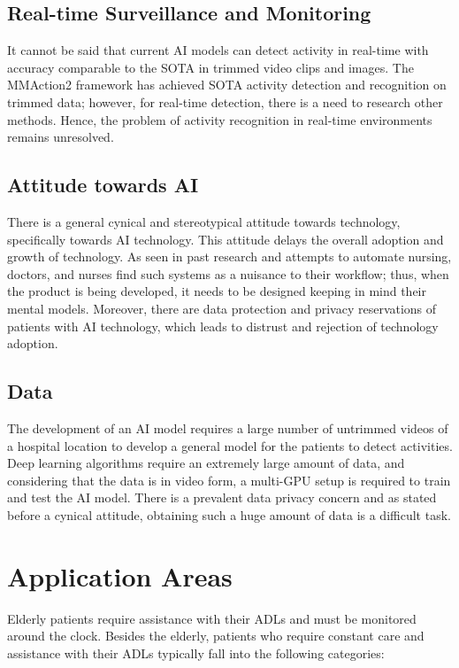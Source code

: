 \subsection{Real-time Surveillance and Monitoring}
It cannot be said that current AI models can detect activity in real-time with accuracy comparable to the SOTA  in trimmed video clips and images. The MMAction2 framework has achieved SOTA activity detection and recognition on trimmed data; however, for real-time detection, there is a need to research other methods. Hence, the problem of activity recognition in real-time environments remains unresolved.

\subsection{Attitude towards AI}
There is a general cynical and stereotypical attitude towards technology, specifically towards AI technology. This attitude delays the overall adoption and growth of technology. As seen in past research and attempts to automate nursing, doctors, and nurses find such systems as a nuisance to their workflow; thus, when the product is being developed, it needs to be designed keeping in mind their mental models. Moreover, there are data protection and privacy reservations of patients with AI technology, which leads to distrust and rejection of technology adoption.

\subsection{Data}
The development of an AI model requires a large number of untrimmed videos of a hospital location to develop a general model for the patients to detect activities. Deep learning algorithms require an extremely large amount of data, and considering that the data is in video form, a multi-GPU setup is required to train and test the AI model. There is a prevalent data privacy concern and as stated before a cynical attitude, obtaining such a huge amount of data is a difficult task. 

\section{Application Areas}

Elderly patients require assistance with their ADLs and must be monitored around the clock. Besides the elderly, patients who require constant care and assistance with their ADLs typically fall into the following categories:

